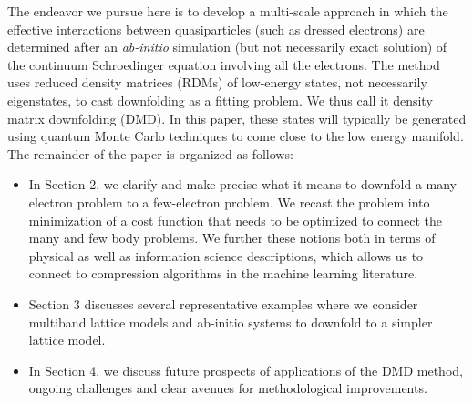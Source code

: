 The endeavor we pursue here is to develop a multi-scale approach in which the effective interactions between quasiparticles (such as dressed electrons) are determined after an \textit{ab-initio} simulation (but not necessarily exact solution) of the continuum Schroedinger equation involving all the electrons. 
The method uses reduced density matrices (RDMs) of low-energy states, not necessarily eigenstates, 
to cast downfolding as a fitting problem. 
We thus call it density matrix downfolding (DMD).
In this paper, these states will typically be generated using quantum Monte Carlo techniques to come close to the low energy manifold.
The remainder of the paper is organized as follows:
\begin{itemize} 
\item 	In Section 2, we clarify and make precise what it means to downfold 
a many-electron problem to a few-electron problem. We recast the problem into minimization 
of a cost function that needs to be optimized to connect the many and few body problems. We further 
these notions both in terms of physical as well as information science descriptions, which allows us to connect to compression algorithms in the machine learning literature. 
\item Section 3 discusses several representative examples where we consider multiband lattice models 
and ab-initio systems to downfold to a simpler lattice model. 
\item In Section 4, we discuss future prospects of applications of the DMD method, ongoing challenges 
and clear avenues for methodological improvements. 
\end{itemize}


